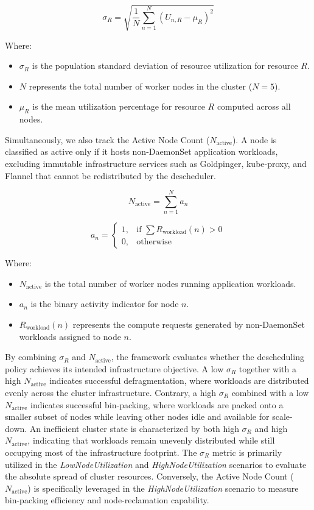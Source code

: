 \[
\sigma_R
=
\sqrt{
\frac{1}{N}
\sum_{n=1}^{N}
(U_{n,R} - \mu_R)^2
}
\]

Where:

\begin{itemize}
    \item \(\sigma_R\) is the population standard deviation of resource utilization for resource \(R\).

    \item \(N\) represents the total number of worker nodes in the cluster (\(N=5\)).

    \item \(\mu_R\) is the mean utilization percentage for resource \(R\) computed across all nodes.
\end{itemize}

Simultaneously, we also track the Active Node Count (\(N_{\text{active}}\)). A node is classified as active only if it hosts non-DaemonSet application workloads, excluding immutable infrastructure services such as Goldpinger, kube-proxy, and Flannel that cannot be redistributed by the descheduler.

\[
N_{\text{active}}
=
\sum_{n=1}^{N} a_n
\]

\[
a_n =
\begin{cases}
1, & \text{if } \sum R_{\text{workload}}(n) > 0 \\
0, & \text{otherwise}
\end{cases}
\]

Where:

\begin{itemize}
    \item \(N_{\text{active}}\) is the total number of worker nodes running application workloads.

    \item \(a_n\) is the binary activity indicator for node \(n\).

    \item \(R_{\text{workload}}(n)\) represents the compute requests generated by non-DaemonSet workloads assigned to node \(n\).
\end{itemize}

By combining \(\sigma_R\) and \(N_{\text{active}}\), the framework evaluates whether the descheduling policy achieves its intended infrastructure objective. A low \(\sigma_R\) together with a high \(N_{\text{active}}\) indicates successful defragmentation, where workloads are distributed evenly across the cluster infrastructure. Contrary, a high \(\sigma_R\) combined with a low \(N_{\text{active}}\) indicates successful bin-packing, where workloads are packed onto a smaller subset of nodes while leaving other nodes idle and available for scale-down. An inefficient cluster state is characterized by both high \(\sigma_R\) and high \(N_{\text{active}}\), indicating that workloads remain unevenly distributed while still occupying most of the infrastructure footprint. The \(\sigma_R\) metric is primarily utilized in the \textit{LowNodeUtilization} and \textit{HighNodeUtilization} scenarios to evaluate the absolute spread of cluster resources. Conversely, the Active Node Count (\(N_{\text{active}}\)) is specifically leveraged in the \textit{HighNodeUtilization} scenario to measure bin-packing efficiency and node-reclamation capability.

